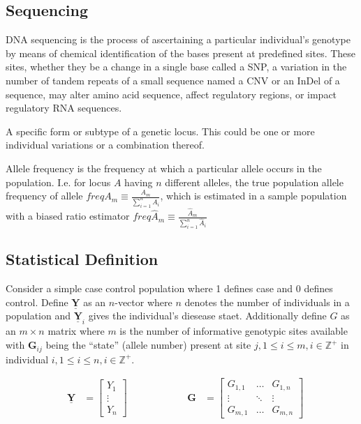 \subsection{Sequencing}

DNA sequencing is the process of ascertaining a particular individual's genotype by means of chemical identification of the bases present at predefined sites. These sites, whether they be a change in a single base called a \ac{SNP}, a variation in the number of tandem repeats of a small sequence named a \ac{CNV} or an \ac{InDel} of a sequence, may alter amino acid sequence, affect regulatory regions, or impact regulatory \ac{RNA} sequences.

\begin{definition}[Allele]
A specific form or subtype of a genetic locus. This could be one or more individual variations or a combination thereof. 
\end{definition}

\begin{rem}
Allele frequency is the frequency at which a particular allele occurs in the population. I.e. for locus $A$ having $n$ different alleles, the true population allele frequency of allele $freq A_m \equiv \frac{A_m}{ \sum^n_{i=1} A_i}$, which is estimated in a sample population with a biased ratio estimator $freq \hat{A}_m \equiv \frac{\hat{A}_m}{ \sum^n_{i=1} \hat{A}_i}$  
\end{rem}

\subsection{Statistical Definition}

Consider a simple case control population where 1 defines case and 0 defines control. Define $\underline{\mathbf{Y}}$ as an $n$-vector where $n$ denotes the number of individuals in a population and $\underline{\mathbf{Y}}_i$ gives the individual's diesease staet. Additionally define $G$ as an $m \times n$ matrix where $m$ is the number of informative genotypic sites available with $\mathbf{G}_{ij}$ being the ``state'' (allele number) present at site $j, 1 \leq i \leq m, i \in \mathbb{Z}^+$ in individual $i, 1 \leq i \leq n, i \in \mathbb{Z}^+$.

$$ \begin{aligned} &\mathbf{\underline{Y}} &= \begin{bmatrix} Y_1 \\ \vdots \\ Y_n \end{bmatrix} \, \, \, \, \, \, \, \,\, \, \, \,\, \, \, \, \, \, \, \, \, \, \, \,\, \, \, \,\, \, \, \, &  \mathbf{G} &= \begin{bmatrix} G_{1,1} & \dots & G_{1, n} \\ \vdots & \ddots & \vdots \\ G_{m, 1} & \dots & G_{m, n} \end{bmatrix} \end{aligned} $$

